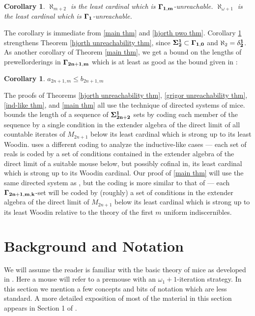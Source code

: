 \documentclass[12pt]{article}
\newtheorem{corollary}[theorem]{Corollary}
\begin{document}
{\begin{corollary}
\label{cor for n=0}
    $\aleph_{m+2}$ is the least cardinal which is $\bf{\Gamma_{1,m}}$-unreachable. $\aleph_{\omega+1}$ is the least cardinal which is $\bf{\Gamma_1}$-unreachable.
\end{corollary}

The corollary is immediate from \ref{main thm} and \ref{hjorth pwo thm}. Corollary \ref{cor for n=0} strengthens Theorem \ref{hjorth unreachability thm}, since $\bf{\Sigma^1_{2}} \subset \Gamma_{1,0}$ and $\aleph_2 = \bf{\delta^1_2}$. As another corollary of Theorem \ref{main thm}, we get a bound on the lengths of prewellorderings in $\bf{\Gamma_{2n+1,m}}$ which is at least as good as the bound given in \cite{on_the_pwo}:

\begin{corollary}
\label{cor on pwo}
    $a_{2n+1,m}\leq b_{2n+1,m}$
\end{corollary}

The proofs of Theorems \ref{hjorth unreachability thm}, \ref{grigor unreachability thm}, \ref{ind-like thm}, and \ref{main thm} all use the technique of directed systems of mice. \cite{hra} bounds the length of a sequence of $\bf{\Sigma^1_{2n+2}}$ sets by coding each member of the sequence by a single condition in the extender algebra of the direct limit of all countable iterates of $M_{2n+1}$ below its least cardinal which is strong up to its least Woodin. \cite{phdthesis} uses a different coding to analyze the inductive-like cases --- each set of reals is coded by a set of conditions contained in the extender algebra of the direct limit of a suitable mouse below, but possibly cofinal in, its least cardinal which is strong up to its Woodin cardinal. Our proof of \ref{main thm} will use the same directed system as \cite{hra}, but the coding is more similar to that of \cite{phdthesis} --- each $\bf{\Gamma_{2n+1,m,k}}$-set will be coded by (roughly) a set of conditions in the extender algebra of the direct limit of $M_{2n+1}$ below its least cardinal which is strong up to its least Woodin relative to the theory of the first $m$ uniform indiscernibles.

\section{Background and Notation}

We will assume the reader is familiar with the basic theory of mice as developed in \cite{ooimt}. Here a mouse will refer to a premouse with an $\omega_1+1$-iteration strategy. In this section we mention a few concepts and bits of notation which are less standard. A more detailed exposition of most of the material in this section appears in Section 1 of \cite{hra}.

}
\end{document}

